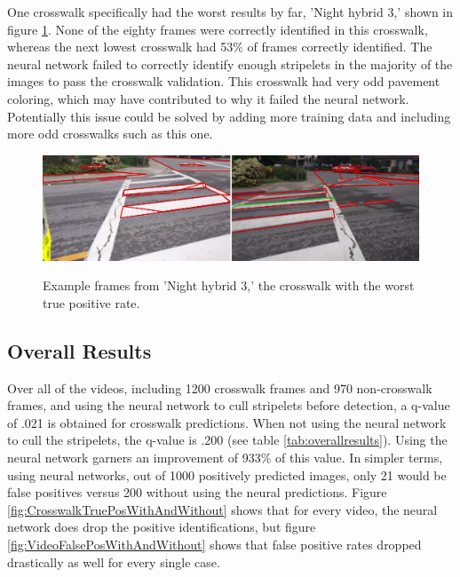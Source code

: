 \documentclass[12pt]{ucthesis}
\newcommand{\captionfonts}{\small\bf\ssp}
\begin{document}
One crosswalk specifically had the worst results by far, 'Night hybrid 3,' shown in figure \ref{fig:worstcwalk}. None of the eighty frames were correctly identified in this crosswalk, whereas the next lowest crosswalk had 53\% of frames correctly identified. The neural network failed to correctly identify enough stripelets in the majority of the images to pass the crosswalk validation. This crosswalk had very odd pavement coloring, which may have contributed to why it failed the neural network.  Potentially this issue could be solved by adding more training data and including more odd crosswalks such as this one. 

\begin{figure}[t]
\begin{center}
\includegraphics[width=14cm]{WorstCwalk.png}
\captionfonts
\caption[Examples of Worst Crosswalk]{Example frames from 'Night hybrid 3,' the crosswalk with the worst true positive rate.}
\label{fig:worstcwalk}
\end{center}
\end{figure}

\clearpage

\subsection{Overall Results}
Over all of the videos, including 1200 crosswalk frames and 970 non-crosswalk frames, and using the neural network to cull stripelets before detection, a q-value of .021 is obtained for crosswalk predictions. When not using the neural network to cull the stripelets, the q-value is .200 (see table \ref{tab:overallresults}). Using the neural network garners an improvement of 933\% of this value. In simpler terms, using neural networks, out of 1000 positively predicted images, only 21 would be false positives versus 200 without using the neural predictions. Figure \ref{fig:CrosswalkTruePosWithAndWithout} shows that for every video, the neural network does drop the positive identifications, but figure \ref{fig:VideoFalsePosWithAndWithout} shows that false positive rates dropped drastically as well for every single case. 
\end{document}
